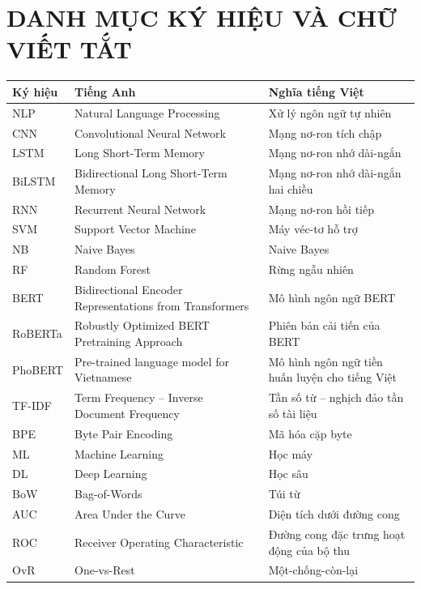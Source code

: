 \documentclass[14pt, a4paper]{report}
\begin{document}
\chapter*{DANH MỤC KÝ HIỆU VÀ CHỮ VIẾT TẮT}
\begin{longtable}{|>{\raggedright\arraybackslash}p{2.0cm}|>{\raggedright\arraybackslash}p{5.6cm}|>{\raggedright\arraybackslash}p{6.4cm}|}
\hline
\textbf{Ký hiệu} & \textbf{Tiếng Anh} & \textbf{Nghĩa tiếng Việt} \\
\hline
NLP & Natural Language Processing & Xử lý ngôn ngữ tự nhiên \\
\hline
CNN & Convolutional Neural Network & Mạng nơ-ron tích chập \\
\hline
LSTM & Long Short-Term Memory & Mạng nơ-ron nhớ dài-ngắn \\
\hline
BiLSTM & Bidirectional Long Short-Term Memory & Mạng nơ-ron nhớ dài-ngắn hai chiều \\
\hline
RNN & Recurrent Neural Network & Mạng nơ-ron hồi tiếp \\
\hline
SVM & Support Vector Machine & Máy véc-tơ hỗ trợ \\
\hline
NB & Naive Bayes & Naive Bayes \\
\hline
RF & Random Forest & Rừng ngẫu nhiên \\
\hline
BERT & Bidirectional Encoder Representations from Transformers & Mô hình ngôn ngữ BERT \\
\hline
RoBERTa & Robustly Optimized BERT Pretraining Approach & Phiên bản cải tiến của BERT \\
\hline
PhoBERT & Pre-trained language model for Vietnamese & Mô hình ngôn ngữ tiền huấn luyện cho tiếng Việt \\
\hline
TF-IDF & Term Frequency -- Inverse Document Frequency & Tần số từ -- nghịch đảo tần số tài liệu \\
\hline
BPE & Byte Pair Encoding & Mã hóa cặp byte \\
\hline
ML & Machine Learning & Học máy \\
\hline
DL & Deep Learning & Học sâu \\
\hline
BoW & Bag-of-Words & Túi từ \\
\hline
AUC & Area Under the Curve & Diện tích dưới đường cong \\
\hline
ROC & Receiver Operating Characteristic & Đường cong đặc trưng hoạt động của bộ thu \\
\hline
OvR & One-vs-Rest & Một-chống-còn-lại \\

\end{longtable}
\end{document}
